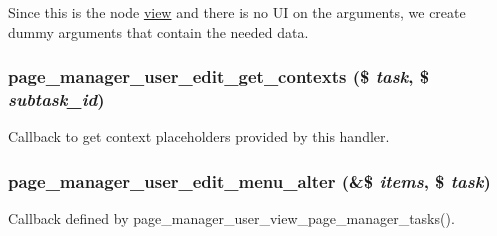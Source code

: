 Since this is the node \hyperlink{classview}{view} and there is no UI on the arguments, we create dummy arguments that contain the needed data. \hypertarget{page__manager_2plugins_2tasks_2user__edit_8inc_a3c42b9d145a377d9575194d0bfb10851}{
\subsubsection[{page\_\-manager\_\-user\_\-edit\_\-get\_\-contexts}]{\setlength{\rightskip}{0pt plus 5cm}page\_\-manager\_\-user\_\-edit\_\-get\_\-contexts (\$ {\em task}, \/  \$ {\em subtask\_\-id})}}
\label{page__manager_2plugins_2tasks_2user__edit_8inc_a3c42b9d145a377d9575194d0bfb10851}
Callback to get context placeholders provided by this handler. \hypertarget{page__manager_2plugins_2tasks_2user__edit_8inc_a46396f0acbd06ad364b85eeb374fbf84}{
\subsubsection[{page\_\-manager\_\-user\_\-edit\_\-menu\_\-alter}]{\setlength{\rightskip}{0pt plus 5cm}page\_\-manager\_\-user\_\-edit\_\-menu\_\-alter (\&\$ {\em items}, \/  \$ {\em task})}}
\label{page__manager_2plugins_2tasks_2user__edit_8inc_a46396f0acbd06ad364b85eeb374fbf84}
Callback defined by page\_\-manager\_\-user\_\-view\_\-page\_\-manager\_\-tasks().

